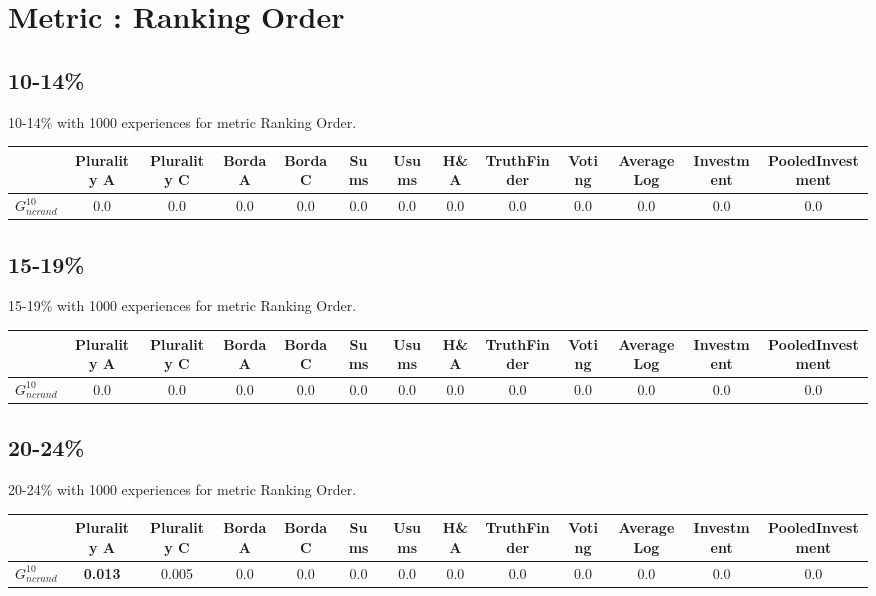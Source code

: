 \documentclass{article}
\newcommand{\graph}[2]{$G_{#1}^{#2}$}
\begin{document}
\newpage
\section{Metric : Ranking Order}

\newpage

\subsection{10-14\%}

10-14\% with 1000 experiences for metric Ranking Order.

\noindent\begin{tabular}{|l|c|c|c|c|c|c|c|c|c|c|c|c|}
\hline
& Plurality A& Plurality C& Borda A& Borda C& Sums& Usums& H\&A& TruthFinder& Voting& AverageLog& Investment& PooledInvestment\\
\hline
\graph{ncrand}{10} &0.0&0.0&0.0&0.0&0.0&0.0&0.0&0.0&0.0&0.0&0.0&0.0\\
\hline
\end{tabular}
\newpage

\subsection{15-19\%}

15-19\% with 1000 experiences for metric Ranking Order.

\noindent\begin{tabular}{|l|c|c|c|c|c|c|c|c|c|c|c|c|}
\hline
& Plurality A& Plurality C& Borda A& Borda C& Sums& Usums& H\&A& TruthFinder& Voting& AverageLog& Investment& PooledInvestment\\
\hline
\graph{ncrand}{10} &0.0&0.0&0.0&0.0&0.0&0.0&0.0&0.0&0.0&0.0&0.0&0.0\\
\hline
\end{tabular}
\newpage

\subsection{20-24\%}

20-24\% with 1000 experiences for metric Ranking Order.

\noindent\begin{tabular}{|l|c|c|c|c|c|c|c|c|c|c|c|c|}
\hline
& Plurality A& Plurality C& Borda A& Borda C& Sums& Usums& H\&A& TruthFinder& Voting& AverageLog& Investment& PooledInvestment\\
\hline
\graph{ncrand}{10} &\textbf{0.013}&0.005&0.0&0.0&0.0&0.0&0.0&0.0&0.0&0.0&0.0&0.0\\
\hline
\end{tabular}
\newpage
\end{document}
